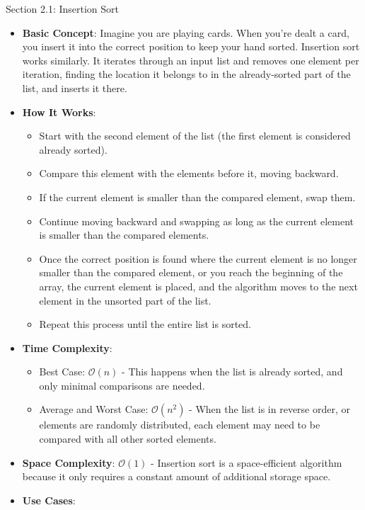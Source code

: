 \begin{notes}{Section 2.1: Insertion Sort}
    \begin{itemize}
        \item \textbf{Basic Concept}: Imagine you are playing cards. When you're dealt a card, you insert it into the correct position to keep your hand sorted. Insertion sort works similarly. It iterates 
        through an input list and removes one element per iteration, finding the location it belongs to in the already-sorted part of the list, and inserts it there.
        \item \textbf{How It Works}:
        \begin{itemize}
            \item Start with the second element of the list (the first element is considered already sorted).
            \item Compare this element with the elements before it, moving backward.
            \item If the current element is smaller than the compared element, swap them.
            \item Continue moving backward and swapping as long as the current element is smaller than the compared elements.
            \item Once the correct position is found where the current element is no longer smaller than the compared element, or you reach the beginning of the array, the current element is placed, 
            and the algorithm moves to the next element in the unsorted part of the list.
            \item Repeat this process until the entire list is sorted.
        \end{itemize}
        \item \textbf{Time Complexity}:
        \begin{itemize}
            \item Best Case: $\mathcal{O}(n)$ - This happens when the list is already sorted, and only minimal comparisons are needed.
            \item Average and Worst Case: $\mathcal{O}(n^{2})$ - When the list is in reverse order, or elements are randomly distributed, each element may need to be compared with all other sorted elements.
        \end{itemize}
        \item \textbf{Space Complexity}: $\mathcal{O}(1)$ - Insertion sort is a space-efficient algorithm because it only requires a constant amount of additional storage space.
        \item \textbf{Use Cases}:

\end{itemize}
\end{notes}
